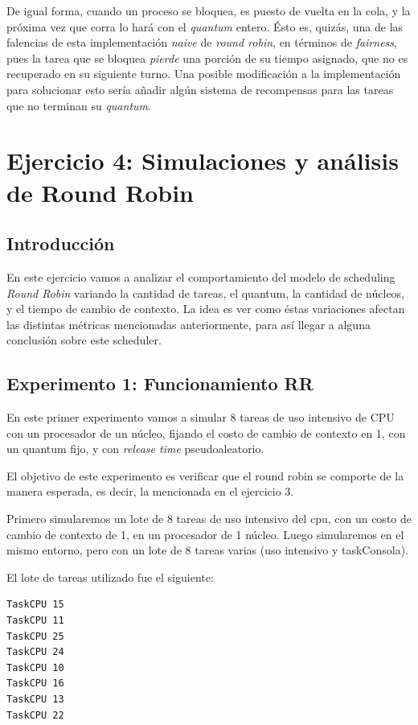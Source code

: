 \documentclass[a4paper]{article}
\begin{document}
De igual forma, cuando un proceso se bloquea, es puesto de vuelta en la
cola, y la próxima vez que corra lo hará con el \textit{quantum} entero.
Ésto es, quizás, una de las falencias de esta implementación \textit{naive}
de \textit{round robin}, en términos de \textit{fairness}, pues la tarea que
se bloquea \textit{pierde} una porción de su tiempo asignado, que no es
recuperado en su siguiente turno. Una posible modificación a la
implementación para solucionar esto sería añadir algún sistema de
recompensas para las tareas que no terminan su \textit{quantum}.

\section{Ejercicio 4: Simulaciones y análisis de Round Robin}

\subsection{Introducción}
En este ejercicio vamos a analizar el comportamiento del modelo de
scheduling \textit{Round Robin} variando la cantidad de tareas, el quantum,
la cantidad de núcleos, y el tiempo de cambio de contexto.
La idea es ver como éstas variaciones afectan las distintas métricas
mencionadas anteriormente, para así llegar a alguna conclusión sobre este
scheduler.

\subsection{Experimento 1: Funcionamiento RR}
En este primer experimento vamos a simular 8 tareas de uso intensivo de CPU
con un procesador de un núcleo, fijando el costo de cambio de contexto en 1,
con un quantum fijo, y con \textit{release time} pseudoaleatorio.

El objetivo de este experimento es verificar que el round robin se comporte
de la manera esperada, es decir, la mencionada en el ejercicio 3.

Primero simularemos un lote de 8 tareas de uso intensivo del cpu, con un
costo de cambio de contexto de 1, en un procesador de 1 núcleo. Luego
simularemos en el mismo entorno, pero con un lote de 8 tareas varias (uso
intensivo y  taskConsola).

El lote de tareas utilizado fue el siguiente:

\begin{verbatim}
TaskCPU 15
TaskCPU 11
TaskCPU 25
TaskCPU 24
TaskCPU 10
TaskCPU 16
TaskCPU 13
TaskCPU 22
\end{verbatim}
\end{document}
